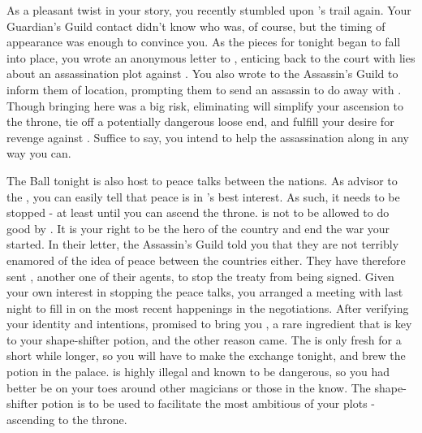 \documentclass[char]{NeptuneBall}
\begin{document}
As a pleasant twist in your story, you recently stumbled upon \cQueen{}'s trail again. Your Guardian's Guild contact didn't know who \cQueen{\they} was, of course, but the timing of \cQueen{\their} appearance was enough to convince you. As the pieces for tonight began to fall into place, you wrote an anonymous letter to \cQueen{}, enticing \cQueen{\them} back to the court with lies about an assassination plot against \cKing{}. You also wrote to the Assassin's Guild to inform them of \cQueen{\their} location, prompting them to send an assassin to do away with \cQueen{}. Though bringing \cQueen{\them} here was a big risk, eliminating \cQueen{} will simplify your ascension to the throne, tie off a potentially dangerous loose end, and fulfill your desire for revenge against \cQueen{\them}. Suffice to say, you intend to help the assassination along in any way you can.

The Ball tonight is also host to peace talks between the nations. As advisor to the \cKing{\King}, you can easily tell that peace is in \pAtlantis{}'s best interest. As such, it needs to be stopped - at least until you can ascend the throne. \cKing{} is not to be allowed to do good by \pAtlantis{}. It is your right to be the hero of the country and end the war your \cExExKing{\parent} started. In their letter, the Assassin's Guild told you that they are not terribly enamored of the idea of peace between the countries either. They have therefore sent \cSpy{}, another one of their agents, to stop the treaty from being signed. Given your own interest in stopping the peace talks, you arranged a meeting with \cSpy{\them} last night to fill \cSpy{\them} in on the most recent happenings in the negotiations. After verifying your identity and intentions, \cSpy{} promised to bring you \iHemlock{\MYname}, a rare ingredient that is key to your shape-shifter potion, and the other reason \cSpy{\they} came. The \iHemlock{\MYname} is only fresh for a short while longer, so you will have to make the exchange tonight, and brew the potion in the palace. \iHemlock{\MYname} is highly illegal and known to be dangerous, so you had better be on your toes around other magicians or those in the know. The shape-shifter potion is to be used to facilitate the most ambitious of your plots - ascending to the throne. 
\end{document}
